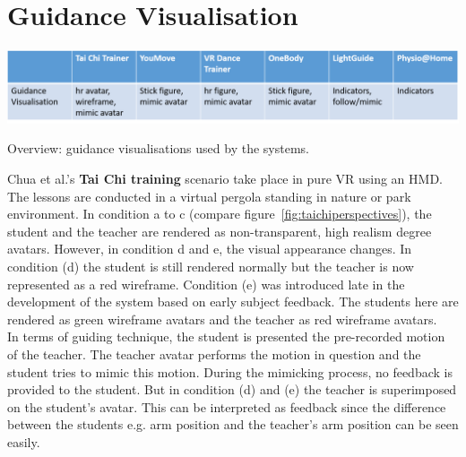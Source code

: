\section{Guidance Visualisation}
\begin{table}[h!]
	\centering
	\includegraphics[width=1.0\textwidth]{img/tbl3.png}
	\caption{Overview: guidance visualisations used by the systems.}
	\label{fig:tbl3}
\end{table}
Chua et al.'s \textbf{Tai Chi training} scenario take place in pure VR using an HMD. The lessons are conducted in a virtual pergola standing in nature or park environment. In condition a to c (compare figure~\ref{fig:taichiperspectives}), the student and the teacher are rendered as non-transparent, high realism degree avatars. However, in condition d and e, the visual appearance changes. In condition (d) the student is still rendered normally but the teacher is now represented as a red wireframe. Condition (e) was introduced late in the development of the system based on early subject feedback. The students here are rendered as green wireframe avatars and the teacher as red wireframe avatars.\\
In terms of guiding technique, the student is presented the pre-recorded motion of the teacher. The teacher avatar performs the motion in question and the student tries to mimic this motion. During the mimicking process, no feedback is provided to the student. But in condition (d) and (e) the teacher is superimposed on the student's avatar. This can be interpreted as feedback since the difference between the students e.g. arm position and the teacher's arm position can be seen easily.\\ \\
